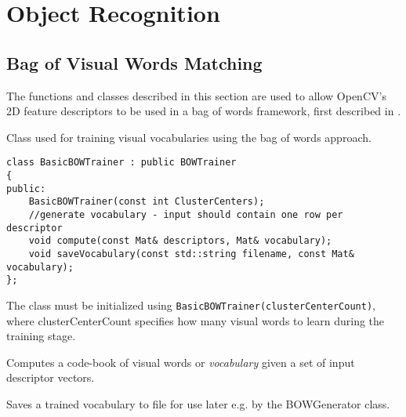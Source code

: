 \section{Object Recognition}

\subsection{Bag of Visual Words Matching}

The functions and classes described in this section are used to allow OpenCV's
2D feature descriptors to be used in a bag of words framework, first described in \cite{sivic_zisserman_2003}.

\ifCpp

Class used for training visual vocabularies using the bag of words approach.

\begin{lstlisting}
class BasicBOWTrainer : public BOWTrainer
{
public:
    BasicBOWTrainer(const int ClusterCenters);
    //generate vocabulary - input should contain one row per descriptor
    void compute(const Mat& descriptors, Mat& vocabulary);
    void saveVocabulary(const std::string filename, const Mat& vocabulary);
};
\end{lstlisting}

The class must be initialized using \texttt{BasicBOWTrainer(clusterCenterCount)}, where clusterCenterCount specifies how many visual words to learn during the training stage.

Computes a code-book of visual words or \emph{vocabulary} given a set of input descriptor vectors.

\begin{description}
\end{description}

Saves a trained vocabulary to file for use later e.g. by the BOWGenerator class.

\begin{description}
\end{description}

